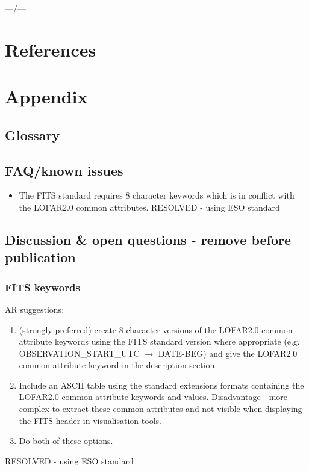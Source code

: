 \documentclass[a4paper,10pt,bibtotoc]{scrartcl}
\begin{document}
---/---

\newpage
\section{References}





\newpage
\appendix
\section{Appendix}

\subsection{Glossary}
\label{sec:glossary}



\subsection{FAQ/known issues}

\begin{itemize}
    \item The FITS standard requires 8 character keywords which is in conflict with the LOFAR2.0 common attributes. {\color{red} RESOLVED - using ESO standard}
\end{itemize}

\subsection{Discussion \& open questions - remove before publication}

\subsubsection{FITS keywords}
AR suggestions:
\begin{enumerate}
    \item (strongly preferred) create 8 character versions of the LOFAR2.0 common attribute keywords using the FITS standard version where appropriate (e.g. {\sc OBSERVATION\_START\_UTC} $\rightarrow$ {\sc DATE-BEG}) and give the LOFAR2.0 common attribute keyword in the description section.
    \item Include an ASCII table using the standard extensions formats containing the LOFAR2.0 common attribute keywords and values. Disadvantage - more complex to extract these common attributes and not visible when displaying the FITS header in visualisation tools.
    \item Do both of these options.
\end{enumerate}
{\color{red} RESOLVED - using ESO standard}
\end{document}
